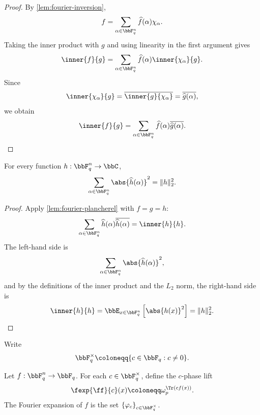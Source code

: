 \begin{proof}\leanok
By \cref{lem:fourier-inversion},
\[
    f=\sum_{\alpha\in\bbF_q^n}\widehat f(\alpha)\chi_\alpha .
\]
Taking the inner product with \(g\) and using linearity in the first argument gives
\[
    \inner{f}{g}
    =
    \sum_{\alpha\in\bbF_q^n}
        \widehat f(\alpha)\inner{\chi_\alpha}{g}.
\]
Since
\[
    \inner{\chi_\alpha}{g}
    =
    \overline{\inner{g}{\chi_\alpha}}
    =
    \overline{\widehat g(\alpha)},
\]
we obtain
\[
    \inner{f}{g}
    =
    \sum_{\alpha\in\bbF_q^n}
        \widehat f(\alpha)\overline{\widehat g(\alpha)}.
\]
\end{proof}

\begin{lemma}
\label{lem:parseval-identity}
\leanok
For every function $h:\bbF_q^n\to\bbC$,
\[
    \sum_{\alpha\in\bbF_q^n}\abs{\widehat h(\alpha)}^2
    =
    \|h\|_2^2.
\]
\end{lemma}

\begin{proof}\leanok
Apply \cref{lem:fourier-plancherel} with \(f=g=h\):
\[
    \sum_{\alpha\in\bbF_q^n}
        \widehat h(\alpha)\overline{\widehat h(\alpha)}
    =
    \inner{h}{h}.
\]
The left-hand side is
\[
    \sum_{\alpha\in\bbF_q^n}\abs{\widehat h(\alpha)}^2,
\]
and by the definitions of the inner product and the $L_2$ norm, the right-hand side is
\[
    \inner{h}{h}
    =
    \bbE_{x\in\bbF_q^n}\left[\abs{h(x)}^2\right]
    =
    \|h\|_2^2.
\]
\end{proof}

\begin{definition}
\label{def:nonzero-field-elements}
\leanok
Write
\[
    \bbF_q^\times \coloneqq \{c\in\bbF_q : c\ne 0\}.
\]
\end{definition}

\begin{definition}
\label{def:fourier-expansion-field-valued}
\leanok
Let $f:\bbF_q^n\to\bbF_q$. For each $c\in\bbF_q^\times$, define the $c$-phase lift
\[
    \fexp{\ff}{c}(x) \coloneqq \omega_p^{\Tr(c f(x))}.
\]
The Fourier expansion of $f$ is the set $\{\varphi_c\}_{c\in \bbF_q^\times}$.
\end{definition}

